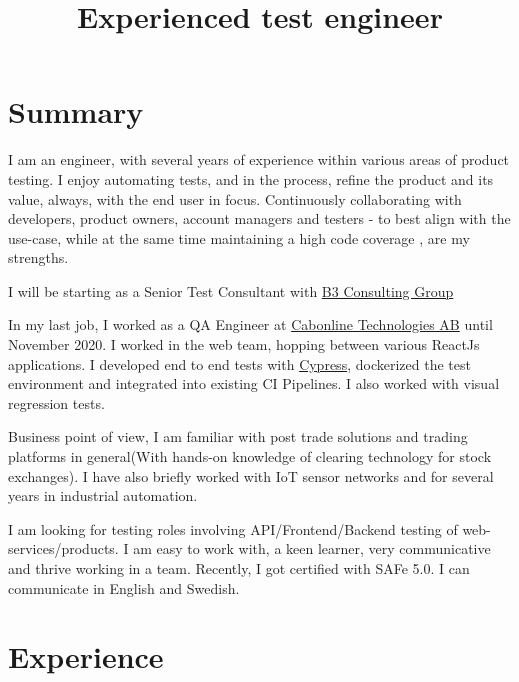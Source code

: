 \documentclass[12pt,a4paper,sans]{moderncv} %
\title{Experienced test engineer}
\begin{document}
\makecvtitle


\section{Summary}
I am an engineer, with several years of experience within various areas of product testing. I enjoy automating tests, and in the process,
refine the product and its value, always, with the end user in focus. Continuously collaborating with developers, product owners,
account managers and testers - to best align with the use-case, while at the same time maintaining a high code coverage , are my strengths.

\hfill \break
I will be starting as a Senior Test Consultant with {\href{https://bli.b3.se/departments/b3-innovation}{\color{cyan}B3 Consulting Group}}

\hfill \break
In my last job,  I worked as a QA Engineer at {\href{https://www.cabonline.com/}{\color{cyan}Cabonline Technologies AB}} until November 2020. I worked
in the web team, hopping between various ReactJs applications. I developed end to end tests with {\href{https://www.cypress.io/}{\color{cyan}Cypress}}, 
dockerized the test environment and integrated into existing CI Pipelines. I also worked with visual regression tests.

\hfill \break
Business point of view, I am familiar with post trade solutions and
trading platforms in general(With hands-on knowledge of clearing technology for stock exchanges). I have also briefly worked
with IoT sensor networks and for several years in industrial automation.

\hfill \break
I am looking for testing roles involving API/Frontend/Backend testing of web-services/products. I am easy to work with,
a keen learner, very communicative and thrive working in a team. Recently, I got certified with SAFe 5.0.
I can communicate in English and Swedish.

\section{Experience}
\end{document}
